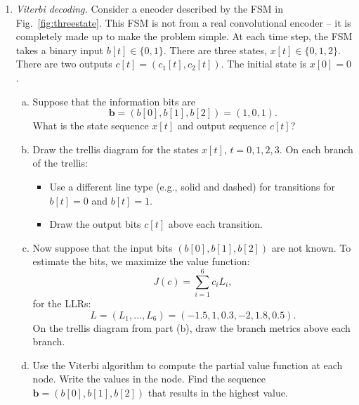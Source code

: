 \documentclass[11pt]{article}
\newcommand{\bs}[1]{{\boldsymbol{{#1}}}}
\begin{document}
\begin{enumerate}
\pagebreak
\item \label{prob:viterbi} \emph{Viterbi decoding.} 
Consider a encoder described by the FSM in Fig.~\ref{fig:threestate}.
This FSM is not from a real convolutional encoder --
it is completely made up to make the problem simple.
At each time step, the FSM takes a binary input 
$b[t] \in \{0,1\}$.
There are three states, $x[t] \in \{0,1,2\}$. 
There are two outputs $c[t]=(c_1[t],c_2[t])$.  The initial state
is $x[0]=0$.

\begin{enumerate}[(a)]
\item Suppose that the information bits are 
\[
    \bs{b} = (b[0],b[1],b[2]) = (1,0,1).
\]
What is the state sequence $x[t]$ and output sequence $c[t]$?
\item Draw the trellis diagram for the states $x[t]$, 
$t=0,1,2,3$.  On each branch of the trellis:
\begin{itemize}
\item Use a different
line type (e.g., solid and dashed) for transitions for $b[t]=0$
and $b[t]=1$.
\item Draw the output bits $c[t]$ above each transition.
\end{itemize}

\item Now suppose that the input bits $(b[0],b[1],b[2])$ 
are not known.  To estimate the bits, 
we maximize the value function:
\[
    J(c) = \sum_{i=1}^6 c_i L_i,
\]
for the LLRs:
\[
    L=(L_1,\ldots,L_6) = (-1.5,1,0.3,-2,1.8,0.5).
\]
On the trellis diagram from part (b), draw the branch metrics
above each branch.

\item Use the Viterbi algorithm to compute the partial value function at each node.  Write the values in the node.
Find the sequence $\bs{b}=(b[0],b[1],b[2])$ that
results in the highest value.

\end{enumerate}


\begin{figure}
\centering

\end{figure}
\end{enumerate}
\end{document}

